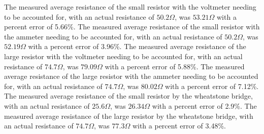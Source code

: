 \documentclass[11pt, titlepage]{article}
\begin{document}
The measured average resistance of the small resistor with the voltmeter needing to be accounted for, with an actual resistance of $50.2 \Omega$, was $53.21 \Omega$ with a percent error of 5.66\%. The measured average resistance of the small resistor with the ammeter needing to be accounted for, with an actual resistance of $50.2 \Omega$, was $52.19 \Omega$ with a percent error of 3.96\%. The measured average resistance of the large resistor with the voltmeter needing to be accounted for, with an actual resistance of $74.7 \Omega$, was $79.09 \Omega$ with a percent error of 5.88\%. The measured average resistance of the large resistor with the ammeter needing to be accounted for, with an actual resistance of $74.7 \Omega$, was $80.02 \Omega$ with a percent error of 7.12\%. The measured average resistance of the small resistor by the wheatstone bridge, with an actual resistance of $25.6 \Omega$, was $26.34 \Omega$ with a percent error of 2.9\%. The measured average resistance of the large resistor by the wheatstone bridge, with an actual resistance of $74.7 \Omega$, was $77.3 \Omega$ with a percent error of 3.48\%.
\end{document}
